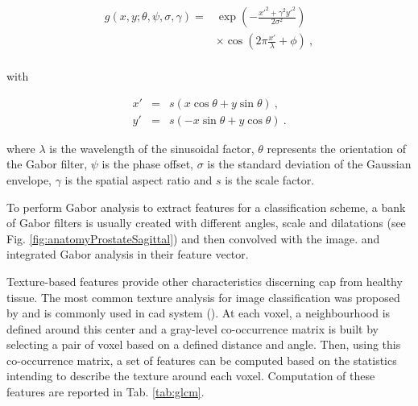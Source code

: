 \begin{enumerate}[leftmargin=*]
\begin{equation}
\begin{aligned}
	g(x,y;\theta,\psi,\sigma,\gamma) = & \exp \left( - \frac{x'^{2}+ \gamma^{2}y'^{2}}{2 \sigma^{2}} \right) \\
	& \times \cos \left( 2 \pi \frac{x'}{\lambda} + \phi \right) \ , \\
\end{aligned}
\end{equation}

\noindent with 

\begin{eqnarray}
	x' & = & s\left( x \cos \theta + y \sin \theta \right) \ , \nonumber \\
	y' & = & s \left( - x \sin \theta + y \cos \theta \right) \ . \nonumber
\end{eqnarray}

\noindent where $\lambda$ is the wavelength of the sinusoidal factor, $\theta$ represents the orientation of the Gabor filter, $\psi$ is the phase offset, $\sigma$ is the standard deviation of the Gaussian envelope, $\gamma$ is the spatial aspect ratio and $s$ is the scale factor.

To perform Gabor analysis to extract features for a classification scheme, a bank of Gabor filters is usually created with different angles, scale and dilatations (see Fig. \ref{fig:anatomyProstateSagittal}) and then convolved with the image. \cite{Viswanath2008a,Viswanath2012} and \cite{Tiwari2012} integrated Gabor analysis in their feature vector.

Texture-based features provide other characteristics discerning \ac{cap} from healthy tissue. The most common texture analysis for image classification was proposed by \cite{Haralick1973} and is commonly used in \ac{cad} system (\cite{Antic2013,Niaf2011,Niaf2012,Tiwari2009a,Tiwari2010,Tiwari2013,Viswanath2008,Viswanath2008a,Viswanath2011,Viswanath2012}). At each voxel, a neighbourhood is defined around this center and a gray-level co-occurrence matrix is built by selecting a pair of voxel based on a defined distance and angle. Then, using this co-occurrence matrix, a set of features can be computed based on the statistics intending to describe the texture around each voxel. Computation of these features are reported in Tab. \ref{tab:glcm}.


\end{enumerate}
